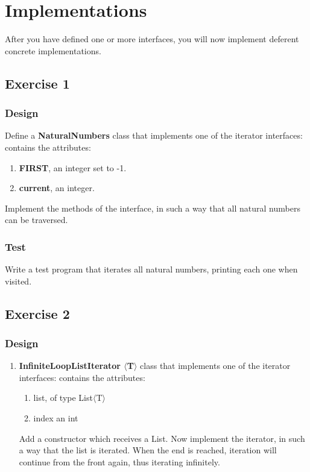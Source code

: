 \section{Implementations}
After you have defined one or more interfaces, you will now implement deferent concrete implementations.

\subsection{Exercise 1}
    \subsubsection{Design}
        Define a \textbf{NaturalNumbers} class that implements one of the iterator interfaces: contains the attributes:
            \begin{enumerate}
                \item \textbf{FIRST}, an integer set to -1.
                \item \textbf{current}, an integer.
            \end{enumerate}
            Implement the methods of the interface, in such a way that all natural numbers can be traversed.

    \subsubsection{Test}
        Write a test program that iterates all natural numbers, printing each one when visited.


\subsection{Exercise 2}
    \subsubsection{Design}
        \begin{enumerate}
            \item \textbf{InfiniteLoopListIterator $\langle$T$\rangle$} class that implements one of the iterator interfaces: contains the attributes:
                \begin{enumerate}
                    \item list, of type List$\langle$T$\rangle$
                    \item index an int
                \end{enumerate}

           Add a constructor which receives a List.
           Now implement the iterator, in such a way that the list is iterated. When the end is reached, iteration will continue from the front again, thus iterating infinitely.
        \end{enumerate}

